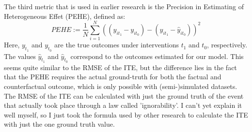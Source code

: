 \documentclass{article}
\begin{document}
The third metric that is used in earlier research is the Precision in Estimating of Heterogeneous Effet (PEHE), defined as:
\begin{equation}
    PEHE := \frac{1}{N} \sum\limits^N_{i=1} \left((y_{it_1} - y_{it_0}) - (\hat{y}_{it_1} - \hat{y}_{it_0}) \right)^2
\end{equation}
Here, $y_{t_1}$ and $y_{t_0}$ are the true outcomes under interventions $t_1$ and $t_0$, respectively. The values $\hat{y}_{t_1}$ and $\hat{y}_{t_0}$ correspond to the outcomes estimated for our model. This seems quite similar to the RMSE of the ITE, but the difference lies in the fact that the PEHE requires the actual ground-truth for both the factual and counterfactual outcome, which is only possible with (semi-)simulated datasets. The RMSE of the ITE can be calculated with just the ground truth of the event that actually took place through a law called 'ignorability'. I can't yet explain it well myself, so I just took the formula used by other research to calculate the ITE with just the one ground truth value.




\end{document}
